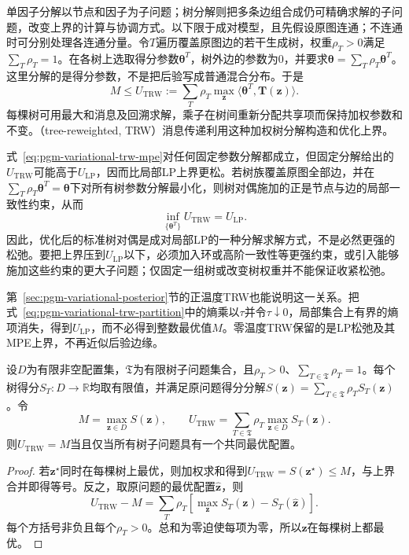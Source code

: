 单因子分解以节点和因子为子问题；树分解则把多条边组合成仍可精确求解的子问题，改变上界的计算与协调方式。以下限于成对模型，且先假设原图连通；不连通时可分别处理各连通分量。令$T$遍历覆盖原图边的若干生成树，权重$\rho_T>0$满足$\sum_T\rho_T=1$。在各树上选取得分参数$\bm{\theta}^T$，树外边的参数为$0$，并要求$\bm{\theta}=\sum_T\rho_T\bm{\theta}^T$。这里分解的是得分参数，不是把后验写成普通混合分布。于是
\begin{equation}
  M\leq U_{\mathrm{TRW}}
     :=\sum_T\rho_T\max_{\bm z}
                    \langle\bm{\theta}^T,\bm T(\bm z)\rangle.
  \label{eq:pgm-variational-trw-mpe}
\end{equation}
每棵树可用最大和消息及回溯求解，乘子在树间重新分配共享项而保持加权参数和不变。（tree-reweighted, TRW）消息传递利用这种加权树分解构造和优化上界。

式~\eqref{eq:pgm-variational-trw-mpe}对任何固定参数分解都成立，但固定分解给出的$U_{\mathrm{TRW}}$可能高于$U_{\mathrm{LP}}$，因而比局部LP上界更松。若树族覆盖原图全部边，并在$\sum_T\rho_T\bm{\theta}^T=\bm{\theta}$下对所有树参数分解最小化，则树对偶施加的正是节点与边的局部一致性约束，从而
\[
  \inf_{\{\bm{\theta}^T\}}
     U_{\mathrm{TRW}}=U_{\mathrm{LP}}.
\]
因此，优化后的标准树对偶是成对局部LP的一种分解求解方式，不是必然更强的松弛。要把上界压到$U_{\mathrm{LP}}$以下，必须加入环或高阶一致性等更强约束，或引入能够施加这些约束的更大子问题；仅固定一组树或改变树权重并不能保证收紧松弛。

第~\ref{sec:pgm-variational-posterior}节的正温度TRW也能说明这一关系。把式~\eqref{eq:pgm-variational-trw-partition}中的熵乘以$\tau$并令$\tau\downarrow0$，局部集合上有界的熵项消失，得到$U_{\mathrm{LP}}$，而不必得到整数最优值$M$。零温度TRW保留的是LP松弛及其MPE上界，不再近似后验边缘。

\begin{lemma}[树一致的最优性证书]
  \label{lem:pgm-variational-tree-agreement}
  设$D$为有限非空配置集，$\mathfrak T$为有限树子问题集合，且$\rho_T>0$、$\sum_{T\in\mathfrak T}\rho_T=1$。每个树得分$S_T:D\to\mathbb R$均取有限值，并满足原问题得分分解$S(\bm z)=\sum_{T\in\mathfrak T}\rho_TS_T(\bm z)$。令
  \[
    M=\max_{\bm z\in D}S(\bm z),
    \qquad
    U_{\mathrm{TRW}}
      =\sum_{T\in\mathfrak T}\rho_T
         \max_{\bm z\in D}S_T(\bm z).
  \]
  则$U_{\mathrm{TRW}}=M$当且仅当所有树子问题具有一个共同最优配置。
\end{lemma}
\begin{proof}
  若$\bm z^\star$同时在每棵树上最优，则加权求和得到$U_{\mathrm{TRW}}=S(\bm z^\star)\leq M$，与上界合并即得等号。反之，取原问题的最优配置$\widehat{\bm z}$，则
  \[
    U_{\mathrm{TRW}}-M
      =\sum_T\rho_T
         \left[\max_{\bm z}S_T(\bm z)-S_T(\widehat{\bm z})\right].
  \]
  每个方括号非负且每个$\rho_T>0$。总和为零迫使每项为零，所以$\widehat{\bm z}$在每棵树上都最优。
\end{proof}


